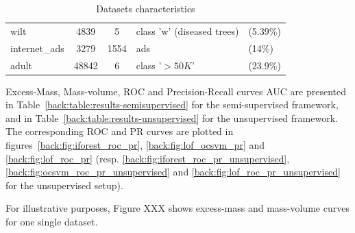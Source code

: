 \begin{table}[h]
\begin{tabular}{|l|cc|ll|}
  wilt        & 4839               & 5                  &    class 'w' (diseased trees)          &    (5.39\%)        \\
 internet\_ads& 3279               & 1554               &   ads                                  & (14\%)             \\
  adult       & 48842              & 6                  &    class '$>50K$'                      &      (23.9\%)      \\
  \hline
\end{tabular}
\caption{Datasets characteristics}
\label{table:data}
\end{table}

Excess-Mass, Mass-volume, ROC and Precision-Recall curves AUC are presented in Table~\ref{back:table:results-semisupervised} for the semi-supervised framework, and in Table~\ref{back:table:results-unsupervised} for the unsupervised framework. The corresponding ROC and PR curves are plotted in figures~\ref{back:fig:iforest_roc_pr}, \ref{back:fig:lof_ocsvm_pr} and \ref{back:fig:lof_roc_pr} (resp. \ref{back:fig:iforest_roc_pr_unsupervised}, \ref{back:fig:ocsvm_roc_pr_unsupervised} and \ref{back:fig:lof_roc_pr_unsupervised} for the unsupervised setup).

For illustrative purposes, Figure XXX shows excess-mass and mass-volume curves for one single dataset.

